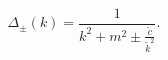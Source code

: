 \begin{equation}
\Delta_{\pm}(k)=\frac1{k^2+m^2\pm\frac{\tilde c}{\tilde k^2}}.\label{prop}
\end{equation}

